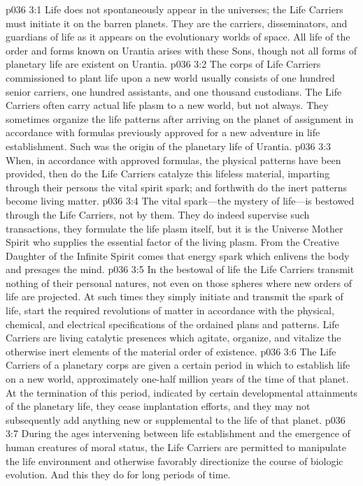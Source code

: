 \vs p036 3:1 Life does not spontaneously appear in the universes; the Life Carriers must initiate it on the barren planets. They are the carriers, disseminators, and guardians of life as it appears on the evolutionary worlds of space. All life of the order and forms known on Urantia arises with these Sons, though not all forms of planetary life are existent on Urantia.
\vs p036 3:2 The corps of Life Carriers commissioned to plant life upon a new world usually consists of one hundred senior carriers, one hundred assistants, and one thousand custodians. The Life Carriers often carry actual life plasm to a new world, but not always. They sometimes organize the life patterns after arriving on the planet of assignment in accordance with formulas previously approved for a new adventure in life establishment. Such was the origin of the planetary life of Urantia.
\vs p036 3:3 When, in accordance with approved formulas, the physical patterns have been provided, then do the Life Carriers catalyze this lifeless material, imparting through their persons the vital spirit spark; and forthwith do the inert patterns become living matter.
\pc \vs p036 3:4 The vital spark---the mystery of life---is bestowed through the Life Carriers, not by them. They do indeed supervise such transactions, they formulate the life plasm itself, but it is the Universe Mother Spirit who supplies the essential factor of the living plasm. From the Creative Daughter of the Infinite Spirit comes that energy spark which enlivens the body and presages the mind.
\pc \vs p036 3:5 In the bestowal of life the Life Carriers transmit nothing of their personal natures, not even on those spheres where new orders of life are projected. At such times they simply initiate and transmit the spark of life, start the required revolutions of matter in accordance with the physical, chemical, and electrical specifications of the ordained plans and patterns. Life Carriers are living catalytic presences which agitate, organize, and vitalize the otherwise inert elements of the material order of existence.
\pc \vs p036 3:6 The Life Carriers of a planetary corps are given a certain period in which to establish life on a new world, approximately one\hyp{}half million years of the time of that planet. At the termination of this period, indicated by certain developmental attainments of the planetary life, they cease implantation efforts, and they may not subsequently add anything new or supplemental to the life of that planet.
\vs p036 3:7 During the ages intervening between life establishment and the emergence of human creatures of moral status, the Life Carriers are permitted to manipulate the life environment and otherwise favorably directionize the course of biologic evolution. And this they do for long periods of time.
